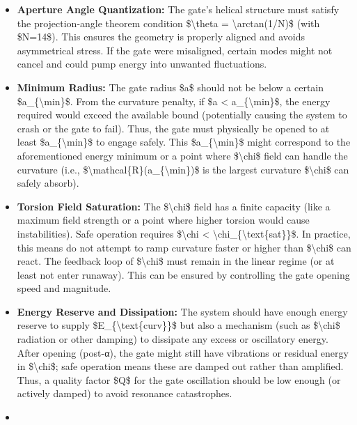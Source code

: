 \documentclass[]{article}
\begin{document}
\begin{itemize}
\item
  \textbf{Aperture Angle Quantization:} The gate's helical structure
  must satisfy the projection-angle theorem condition
  \$\textbackslash{}theta = \textbackslash{}arctan(1/N)\$ (with
  \$N=14\$). This ensures the geometry is properly aligned and avoids
  asymmetrical stress. If the gate were misaligned, certain modes might
  not cancel and could pump energy into unwanted fluctuations.
\item
  \textbf{Minimum Radius:} The gate radius \$a\$ should not be below a
  certain \$a\_\{\textbackslash{}min\}\$. From the curvature penalty, if
  \$a \textless{} a\_\{\textbackslash{}min\}\$, the energy required
  would exceed the available bound (potentially causing the system to
  crash or the gate to fail). Thus, the gate must physically be opened
  to at least \$a\_\{\textbackslash{}min\}\$ to engage safely. This
  \$a\_\{\textbackslash{}min\}\$ might correspond to the aforementioned
  energy minimum or a point where \$\textbackslash{}chi\$ field can
  handle the curvature (i.e.,
  \$\textbackslash{}mathcal\{R\}(a\_\{\textbackslash{}min\})\$ is the
  largest curvature \$\textbackslash{}chi\$ can safely absorb).
\item
  \textbf{Torsion Field Saturation:} The \$\textbackslash{}chi\$ field
  has a finite capacity (like a maximum field strength or a point where
  higher torsion would cause instabilities). Safe operation requires
  \$\textbar{}\textbackslash{}chi\textbar{} \textless{}
  \textbackslash{}chi\_\{\textbackslash{}text\{sat\}\}\$. In practice,
  this means do not attempt to ramp curvature faster or higher than
  \$\textbackslash{}chi\$ can react. The feedback loop of
  \$\textbackslash{}chi\$ must remain in the linear regime (or at least
  not enter runaway). This can be ensured by controlling the gate
  opening speed and magnitude.
\item
  \textbf{Energy Reserve and Dissipation:} The system should have enough
  energy reserve to supply \$E\_\{\textbackslash{}text\{curv\}\}\$ but
  also a mechanism (such as \$\textbackslash{}chi\$ radiation or other
  damping) to dissipate any excess or oscillatory energy. After opening
  (post-α), the gate might still have vibrations or residual energy in
  \$\textbackslash{}chi\$; safe operation means these are damped out
  rather than amplified. Thus, a quality factor \$Q\$ for the gate
  oscillation should be low enough (or actively damped) to avoid
  resonance catastrophes.
\item

\end{itemize}
\end{document}
